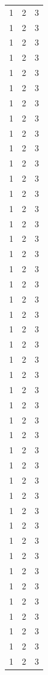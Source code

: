 \begin{center}
\begin{longtable}{l|l|l}
        1 & 2 & 3\\
        1 & 2 & 3\\
        1 & 2 & 3\\
        1 & 2 & 3\\
        1 & 2 & 3\\
        1 & 2 & 3\\
        1 & 2 & 3\\
        1 & 2 & 3\\
        1 & 2 & 3\\
        1 & 2 & 3\\
        1 & 2 & 3\\
        1 & 2 & 3\\
        1 & 2 & 3\\
        1 & 2 & 3\\
        1 & 2 & 3\\
        1 & 2 & 3\\
        1 & 2 & 3\\
        1 & 2 & 3\\
        1 & 2 & 3\\
        1 & 2 & 3\\
        1 & 2 & 3\\
        1 & 2 & 3\\
        1 & 2 & 3\\
        1 & 2 & 3\\
        1 & 2 & 3\\
        1 & 2 & 3\\
        1 & 2 & 3\\
        1 & 2 & 3\\
        1 & 2 & 3\\
        1 & 2 & 3\\
        1 & 2 & 3\\
        1 & 2 & 3\\
        1 & 2 & 3\\
        1 & 2 & 3\\
        1 & 2 & 3\\
        1 & 2 & 3\\
        1 & 2 & 3\\
        1 & 2 & 3\\
        1 & 2 & 3\\
        1 & 2 & 3\\
        1 & 2 & 3\\
        1 & 2 & 3\\
        1 & 2 & 3\\
        1 & 2 & 3\\

\end{longtable}
\end{center}
